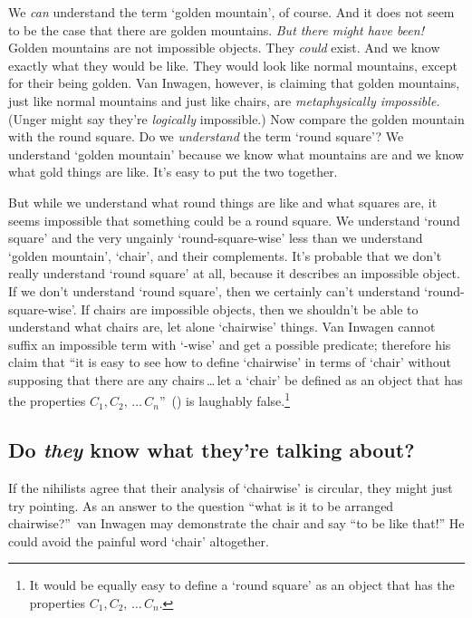\documentclass[11pt]{article}
\begin{document}
\begin{spacing}{1.5}
We {\em can} understand the term `golden mountain', of course. And it does not seem to be the case that there are golden mountains. {\em But there might have been!} Golden mountains are not impossible objects. They {\em could} exist. And we know exactly what they would be like. They would look like normal mountains, except for their being golden. Van Inwagen, however, is claiming that golden mountains, just like normal mountains and just like chairs, are {\em metaphysically impossible.} (Unger might say they're {\em logically} impossible.) Now compare the golden mountain with the round square. Do we {\em understand} the term `round square'? We understand `golden mountain' because we know what mountains are and we know what gold things are like. It's easy to put the two together.

But while we understand what round things are like and what squares are, it seems impossible that something could be a round square. We understand `round square' and the very ungainly `round-square-wise' less than we understand `golden mountain', `chair', and their complements. It's probable that we don't really understand `round square' at all, because it describes an impossible object. If we don't understand `round square', then we certainly can't understand `round-square-wise'. If chairs are impossible objects, then we shouldn't be able to understand what chairs are, let alone `chairwise' things. Van Inwagen cannot suffix an impossible term with `-wise' and get a possible predicate; therefore his claim that ``it is easy to see how to define `chairwise' in terms of `chair' without supposing that there are any chairs\,\ldots\,let a `chair' be defined as an object that has the properties $C_{1}, C_{2},\,\dots\,C_{n}$''~(\citeyear[719]{inwagen1993b}) is laughably false.\footnote{It would be equally easy to define a `round square' as an object that has the properties $C_{1}, C_{2},\,\dots\,C_{n}$.}
%

\subsection{Do {\em they} know what they're talking about?}
If the nihilists agree that their analysis of `chairwise' is circular, they might just try pointing. As an answer to the question ``what is it to be arranged chairwise?''\ van Inwagen may demonstrate the chair and say ``to be like that!'' He could avoid the painful word `chair' altogether.


\end{spacing}
\end{document}
